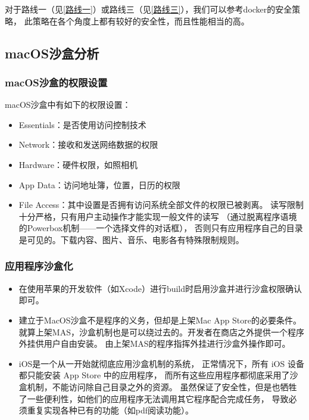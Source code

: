 \documentclass[AutoFakeBold,a4paper]{ctexart}
\begin{document}
对于路线一（见\ref{路线一}）或路线三（见\ref{路线三}），我们可以参考docker的安全策略，
此策略在各个角度上都有较好的安全性，而且性能相当的高。

\subsection{macOS沙盒分析}

\subsubsection{macOS沙盒的权限设置}

macOS沙盒中有如下的权限设置\cite{hoog2011iphone}：

\begin{itemize}
    \item Essentials：是否使用访问控制技术
    \item Network：接收和发送网络数据的权限
    \item Hardware：硬件权限，如照相机
    \item App Data：访问地址簿，位置，日历的权限
    \item File Access：其中设置是否拥有访问系统全部文件的权限已被剥离。
    读写限制十分严格，只有用户主动操作才能实现一般文件的读写
    （通过脱离程序语境的Powerbox机制——一个选择文件的对话框），
    否则只有应用程序自己的目录是可见的。下载内容、图片、音乐、电影各有特殊限制规则。
\end{itemize}

\subsubsection{应用程序沙盒化}

\begin{itemize}
    \item 在使用苹果的开发软件（如Xcode）进行build时启用沙盒并进行沙盒权限确认即可。
    \item 建立于MacOS沙盒不是程序的义务，但却是上架Mac App Store的必要条件。
    就算上架MAS，沙盒机制也是可以绕过去的。开发者在商店之外提供一个程序外挂供用户自由安装。
    由上架MAS的程序指挥外挂进行沙盒外操作即可。
    \item iOS是一个从一开始就彻底应用沙盒机制的系统，
    正常情况下，所有 iOS 设备都只能安装 App Store 中的应用程序，
    而所有这些应用程序都彻底采用了沙盒机制，不能访问除自己目录之外的资源。
    虽然保证了安全性，但是也牺牲了一些便利性，如他们的应用程序无法调用其它程序配合完成任务，
    导致必须重复实现各种已有的功能（如pdf阅读功能）。
\end{itemize}
\end{document}
